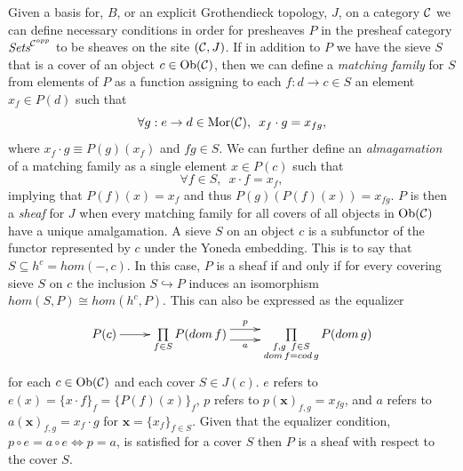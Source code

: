 \documentclass[aps,twocolumn]{revtex4-1}
\begin{document}
\iftoggle{thmsty}{
\begin{definition}
\label{definition-sheaves}
}{}
Given a basis for, $B$, or an explicit Grothendieck topology, $J$, on a category ${\mathcal C}$ we can define necessary conditions in order for presheaves $P$ in the presheaf category $\textit{Sets}^{{\mathcal C}^{opp}}$ to be sheaves on the site $({\mathcal C},J)$. If in addition to $P$ we have the sieve $S$ that is a cover of an object $c \in \mathop{\rm Ob}\nolimits({\mathcal C})$, then we can define a {\it matching family} for $S$ from elements of $P$ as a function assigning to each $f:d \rightarrow c \in S$ an element $x_f \in P(d)$ such that
$$
\forall g:e \rightarrow d \in \mathop{\rm Mor}\nolimits({\mathcal C}), \,\,\, x_f \cdot g = x_{fg},
$$
where $x_f \cdot g \equiv P(g)(x_f)$ and $fg \in S$. We can further define an {\it almagamation} of a matching family as a single element $x \in P(c)$ such that
$$
\forall f \in S, \,\,\, x \cdot f = x_f,
$$
implying that $P(f)(x)=x_f$ and thus $P(g)(P(f)(x))=x_{fg}$. $P$ is then a {\it sheaf} for $J$ when every matching family for all covers of all objects in $\mathop{\rm Ob}\nolimits({\mathcal C})$ have a unique amalgamation. A sieve $S$ on an object $c$ is a subfunctor of the functor represented by $c$ under the Yoneda embedding. This is to say that $S \subseteq h^c = hom(-,c)$. In this case, $P$ is a sheaf if and only if for every covering sieve $S$ on $c$ the inclusion $S \hookrightarrow P$ induces an isomorphism $hom(S,P) \cong hom(h^c,P)$. This can also be expressed as the equalizer
\begin{displaymath}
\xymatrix{
P(c) \ar[r]
&
\prod\limits_{f \in S}
P(dom \, f)
\ar@<1ex>[r]^-{p} \ar@<-1ex>[r]_-{a}
&
\prod\limits_{\substack{f,g \,\,\, f \in S \\ dom \, f=cod \, g}}
P(dom \, g)
}
\end{displaymath}
\noindent for each $c \in \mathop{\rm Ob}\nolimits({\mathcal C})$ and each cover $S \in J(c)$. $e$ refers to $e(x)=\{x \cdot f\}_f = \{P(f)(x)\}_f$, $p$ refers to $p( \mathbf{x} )_{f,g} = x_{fg}$, and $a$ refers to $a( \mathbf{x} )_{f,g} = x_f \cdot g$ for $\mathbf{x} = \{ x_f \}_{f \in S}$. Given that the equalizer condition, $p \circ e = a \circ e \Leftrightarrow p=a$, is satisfied for a cover $S$ then $P$ is a sheaf with respect to the cover $S$.
\end{document}
